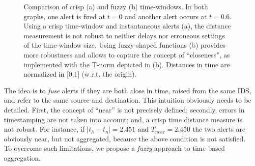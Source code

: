 \begin{figure}[p]
  \centering
  

  
  \caption{Comparison of crisp (a) and fuzzy (b) time-windows. In both
    graphs, one alert is fired at $t = 0$ and another alert occurs at
    $t = 0.6$. Using a crisp time-window and instantaneous alerts (a),
    the distance measurement is not robust to neither delays nor
    erroneous settings of the time-window size. Using fuzzy-shaped
    functions (b) provides more robustness and allows to capture the
    concept of ``closeness'', as implemented with the \textsf{T}-norm
    depicted in (b). Distances in time are normalized in [0,1]
    (w.r.t. the origin).}
  \label{fig:crisp_fuzzy_distance}
\end{figure}

The idea is to \emph{fuse} alerts if they are both close in time, raised from the same \ac{IDS}, and refer to the same source and destination. This intuition obviously needs to be detailed. First, the concept of ``near'' is not precisely defined; secondly, errors in timestamping are not taken into account; and, a crisp time distance measure is not robust. For instance, if $|t_{h} - t_{n}| = 2.451$ and $T_{near} = 2.450$ the two alerts are obviously near, but not aggregated, because the above condition is not satisfied. To overcome such limitations, we propose a \emph{fuzzy} approach to time-based aggregation.

